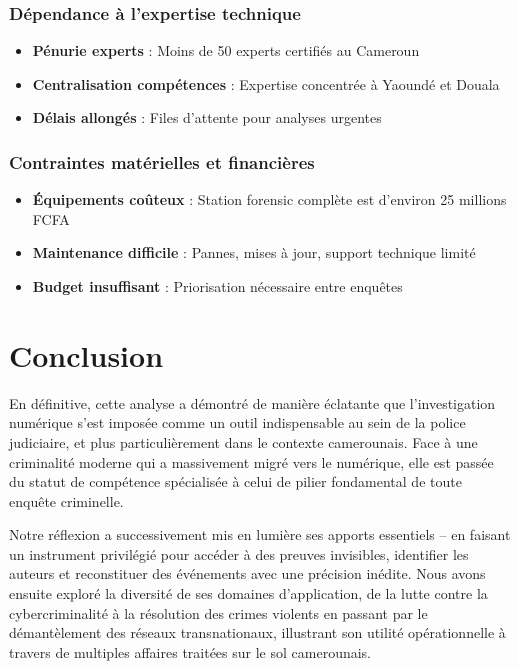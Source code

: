 \documentclass[12pt,a4paper]{article}
\begin{document}
\subsubsection{Dépendance à l'expertise technique}
\begin{itemize}[leftmargin=*]
    \item \textbf{Pénurie experts} : Moins de 50 experts certifiés au Cameroun
    \item \textbf{Centralisation compétences} : Expertise concentrée à Yaoundé et Douala
    \item \textbf{Délais allongés} : Files d'attente pour analyses urgentes
\end{itemize}

\subsubsection{Contraintes matérielles et financières}
\begin{itemize}[leftmargin=*]
    \item \textbf{Équipements coûteux} : Station forensic complète est d'environ 25 millions FCFA
    \item \textbf{Maintenance difficile} : Pannes, mises à jour, support technique limité
    \item \textbf{Budget insuffisant} : Priorisation nécessaire entre enquêtes
\end{itemize}

\section{Conclusion}

En définitive, cette analyse a démontré de manière éclatante que l'investigation numérique s'est imposée comme un outil indispensable au sein de la police judiciaire, et plus particulièrement dans le contexte camerounais. Face à une criminalité moderne qui a massivement migré vers le numérique, elle est passée du statut de compétence spécialisée à celui de pilier fondamental de toute enquête criminelle.

Notre réflexion a successivement mis en lumière ses apports essentiels -- en faisant un instrument privilégié pour accéder à des preuves invisibles, identifier les auteurs et reconstituer des événements avec une précision inédite. Nous avons ensuite exploré la diversité de ses domaines d'application, de la lutte contre la cybercriminalité à la résolution des crimes violents en passant par le démantèlement des réseaux transnationaux, illustrant son utilité opérationnelle à travers de multiples affaires traitées sur le sol camerounais.
\end{document}
